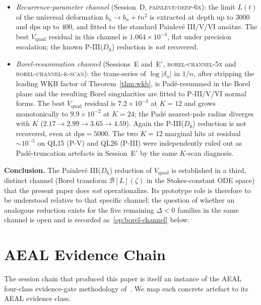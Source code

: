 \documentclass[12pt]{amsart}
\theoremstyle{definition}
\begin{document}
\begin{itemize}
\item \emph{Recurrence-parameter channel} (Session~D,
\textsc{painleve-deep-6x}): the limit $L(t)$ of the universal
deformation $b_{n}\to b_{n}+t n^{2}$ is extracted at depth up to
$3000$ and $\mathrm{dps}$ up to $400$, and fitted to the standard
Painlev\'e III/V/VI ans\"atze. The best $V_{\mathrm{quad}}$ residual
in this channel is $1.064\times 10^{-4}$, flat under precision
escalation; the known P-III($D_{6}$) reduction is \emph{not}
recovered.

\item \emph{Borel-resummation channel} (Sessions~E and~E$'$,
\textsc{borel-channel-5x} and \textsc{borel-channel-k-scan}): the
trans-series of $\log|\delta_{n}|$ in $1/n$, after stripping the
leading WKB factor of Theorem~\ref{thm:wkb}, is Pad\'e-resummed in
the Borel plane and the resulting Borel singularities are fitted to
P-III/V/VI normal forms. The best $V_{\mathrm{quad}}$ residual is
$7.2\times 10^{-3}$ at $K=12$ and grows monotonically to
$9.9\times 10^{-2}$ at $K=24$; the Pad\'e nearest-pole radius
diverges with $K$ ($2.17\to 2.99\to 3.65\to 4.59$). Again the
P-III($D_{6}$) reduction is not recovered, even at
$\mathrm{dps}=5000$. The two $K=12$ marginal hits at residual
$\sim 10^{-5}$ on QL15 (P-V) and QL26 (P-III) were independently
ruled out as Pad\'e-truncation artefacts in Session~E$'$ by the
same $K$-scan diagnosis.
\end{itemize}

\noindent\textbf{Conclusion.} The Painlev\'e III($D_{6}$) reduction
of $V_{\mathrm{quad}}$ is established in a third, distinct channel
(Borel transform $\mathcal{B}[L](\zeta)$ in the Stokes-constant ODE
space) that the present paper does \emph{not} operationalize. Its
prototype role is therefore to be understood relative to that
specific channel; the question of whether an analogous reduction
exists for the five remaining $\Delta<0$ families in the same
channel is open and is recorded as~\ref{op:borel-channel} below.

\section{AEAL Evidence Chain}\label{sec:aeal}

The session chain that produced this paper is itself an instance of the
AEAL four-class evidence-gate methodology of~\cite{P8AEAL}. We map each
concrete artefact to its AEAL evidence class.
\end{document}
